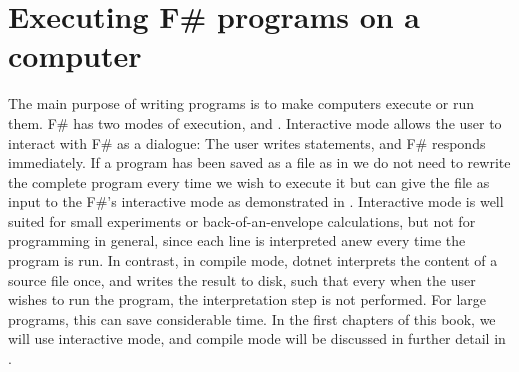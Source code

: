 \documentclass[fsharpNotes.tex]{subfiles}
\begin{document}
\section{Executing F\# programs on a computer}
The main purpose of writing programs is to make computers execute or run them. F\# has two modes of execution,  and . Interactive mode allows the user to interact with F\# as a dialogue: The user writes statements, and F\# responds immediately. If a program has been saved as a file as in  we do not need to rewrite the complete program every time we wish to execute it but can give the file as input to the F\#'s interactive mode as demonstrated in . Interactive mode is well suited for small experiments or back-of-an-envelope calculations, but not for programming in general, since each line is interpreted anew every time the program is run. In contrast, in compile mode, dotnet interprets the content of a source file once, and writes the result to disk, such that every when the user wishes to run the program, the interpretation step is not performed. For large programs, this can save considerable time. In the first chapters of this book, we will use interactive mode, and compile mode will be discussed in further detail in .
\end{document}
